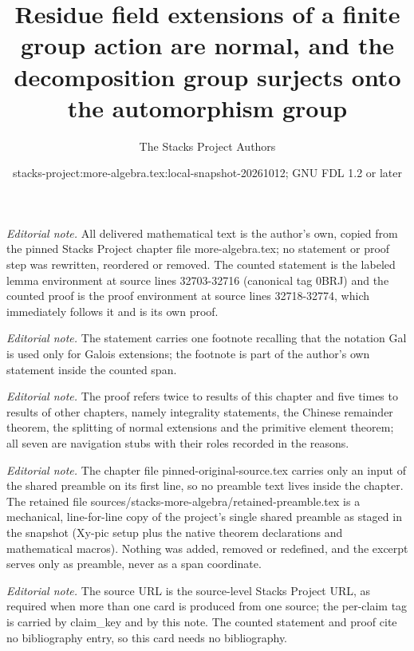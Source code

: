 \documentclass[10pt,a4paper]{amsart}
\title{Residue field extensions of a finite group action are normal, and the decomposition group surjects onto the automorphism group}
\author{The Stacks Project Authors}
\date{stacks-project:more-algebra.tex:local-snapshot-20261012; GNU FDL 1.2 or later}
\theoremstyle{plain}
\theoremstyle{definition}
\theoremstyle{remark}
\numberwithin{equation}{subsection}
\begin{document}
\maketitle
\setcounter{subsection}{1}
\noindent\textit{Editorial note.} All delivered mathematical text is the author's own, copied from the pinned Stacks Project chapter file more-algebra.tex; no statement or proof step was rewritten, reordered or removed. The counted statement is the labeled lemma environment at source lines 32703-32716 (canonical tag 0BRJ) and the counted proof is the proof environment at source lines 32718-32774, which immediately follows it and is its own proof.\par\medskip
\noindent\textit{Editorial note.} The statement carries one footnote recalling that the notation Gal is used only for Galois extensions; the footnote is part of the author's own statement inside the counted span.\par\medskip
\noindent\textit{Editorial note.} The proof refers twice to results of this chapter and five times to results of other chapters, namely integrality statements, the Chinese remainder theorem, the splitting of normal extensions and the primitive element theorem; all seven are navigation stubs with their roles recorded in the reasons.\par\medskip
\noindent\textit{Editorial note.} The chapter file pinned-original-source.tex carries only an input of the shared preamble on its first line, so no preamble text lives inside the chapter. The retained file sources/stacks-more-algebra/retained-preamble.tex is a mechanical, line-for-line copy of the project's single shared preamble as staged in the snapshot (Xy-pic setup plus the native theorem declarations and mathematical macros). Nothing was added, removed or redefined, and the excerpt serves only as preamble, never as a span coordinate.\par\medskip
\noindent\textit{Editorial note.} The source URL is the source-level Stacks Project URL, as required when more than one card is produced from one source; the per-claim tag is carried by claim\_key and by this note. The counted statement and proof cite no bibliography entry, so this card needs no bibliography.\par\medskip
\end{document}
